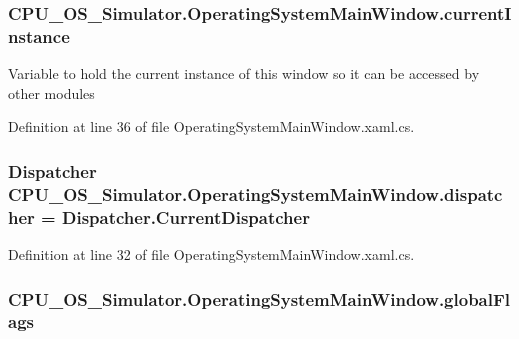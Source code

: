 \subsubsection[{current\+Instance}]{ C\+P\+U\+\_\+\+O\+S\+\_\+\+Simulator.\+Operating\+System\+Main\+Window.\+current\+Instance\hspace{0.3cm}{\ttfamily [static]}}\label{class_c_p_u___o_s___simulator_1_1_operating_system_main_window_ac659b34226b30276331daba60ec7d439}


Variable to hold the current instance of this window so it can be accessed by other modules 



Definition at line 36 of file Operating\+System\+Main\+Window.\+xaml.\+cs.

\hypertarget{class_c_p_u___o_s___simulator_1_1_operating_system_main_window_ac0f8e9dfcaba558927c53e11815fb0fb}{}
\subsubsection[{dispatcher}]{\setlength{\rightskip}{0pt plus 5cm}Dispatcher C\+P\+U\+\_\+\+O\+S\+\_\+\+Simulator.\+Operating\+System\+Main\+Window.\+dispatcher = Dispatcher.\+Current\+Dispatcher\hspace{0.3cm}{\ttfamily [private]}}\label{class_c_p_u___o_s___simulator_1_1_operating_system_main_window_ac0f8e9dfcaba558927c53e11815fb0fb}


Definition at line 32 of file Operating\+System\+Main\+Window.\+xaml.\+cs.

\hypertarget{class_c_p_u___o_s___simulator_1_1_operating_system_main_window_a905f81a88e7878e936352f6da9ffcb93}{}
\subsubsection[{global\+Flags}]{ C\+P\+U\+\_\+\+O\+S\+\_\+\+Simulator.\+Operating\+System\+Main\+Window.\+global\+Flags\hspace{0.3cm}{\ttfamily [private]}}\label{class_c_p_u___o_s___simulator_1_1_operating_system_main_window_a905f81a88e7878e936352f6da9ffcb93}


